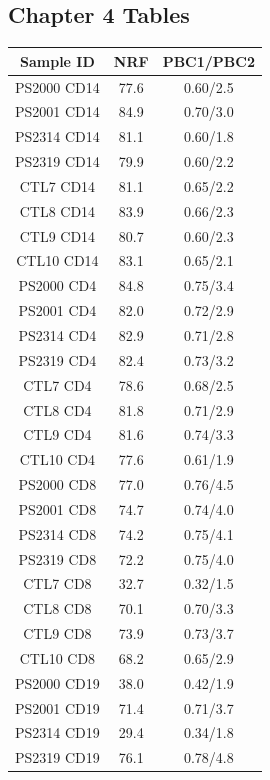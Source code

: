 \subsection{Chapter 4 Tables}

\begin{table}[htbp]
\centering
\begin{tabular}{@{} c c c}
\toprule
\textbf{Sample ID} & \textbf{NRF} & \textbf{PBC1/PBC2} \\
\midrule
\midrule
PS2000 CD14	& 77.6	& 0.60/2.5\\
PS2001 CD14	& 84.9	& 0.70/3.0\\
PS2314 CD14	& 81.1	& 0.60/1.8\\
PS2319 CD14	& 79.9	& 0.60/2.2\\
CTL7 CD14	  & 81.1	& 0.65/2.2\\
CTL8 CD14	  & 83.9	& 0.66/2.3\\
CTL9 CD14	  & 80.7	& 0.60/2.3\\
CTL10 CD14	& 83.1	& 0.65/2.1\\
\midrule
PS2000 CD4  & 84.8	& 0.75/3.4\\
PS2001 CD4	& 82.0	& 0.72/2.9\\
PS2314 CD4	& 82.9	& 0.71/2.8\\
PS2319 CD4	& 82.4	& 0.73/3.2\\
CTL7 CD4	  & 78.6	& 0.68/2.5\\
CTL8 CD4    & 81.8	& 0.71/2.9\\
CTL9 CD4    & 81.6	& 0.74/3.3\\
CTL10 CD4   & 77.6	& 0.61/1.9\\
\midrule
PS2000 CD8 & 77.0 &	0.76/4.5\\
PS2001 CD8 & 74.7 &	0.74/4.0\\
PS2314 CD8 & 74.2 &	0.75/4.1\\
PS2319 CD8 & 72.2 &	0.75/4.0\\
CTL7 CD8	 & 32.7 & 0.32/1.5\\
CTL8 CD8	 & 70.1 &	0.70/3.3\\
CTL9 CD8	 & 73.9 &	0.73/3.7\\
CTL10 CD8	 & 68.2 &	0.65/2.9\\
\midrule
PS2000 CD19	& 38.0 & 0.42/1.9\\
PS2001 CD19	& 71.4 & 0.71/3.7\\
PS2314 CD19	& 29.4 & 0.34/1.8\\
PS2319 CD19	& 76.1 & 0.78/4.8\\

\end{tabular}
\end{table}
